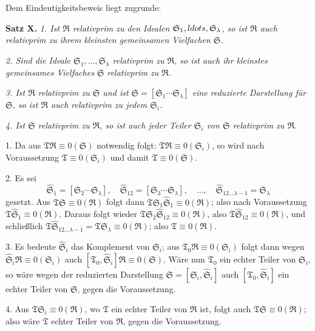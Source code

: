 \documentclass[11pt]{article}
\newcommand{\ideal}[1]{\mathfrak{#1}}
\begin{document}
Dem Eindeutigkeitsbeweis liegt zugrunde:

\textbf{Satz X.} \emph{1. Ist $\ideal R$ relativprim zu den Idealen $\ideal S_1,\\ldots,\ideal S_\lambda$, so ist $\ideal R$ auch relativprim zu ihrem kleinsten gemeinsamen Vielfachen $\ideal S$.}

\emph{2. Sind die Ideale $\ideal S_1,
\ldots,\ideal S_\lambda$ relativprim zu $\ideal R$, so ist auch ihr kleinstes gemeinsames Vielfaches $\ideal S$ relativprim zu $\ideal R$.}

\emph{3. Ist $\ideal R$ relativprim zu $\ideal S$ und ist $\ideal S=[\ideal S_1\cdots\ideal S_\lambda]$ eine reduzierte Darstellung für $\ideal S$, so ist $\ideal R$ auch relativprim zu jedem $\ideal S_i$.}

\emph{4. Ist $\ideal S$ relativprim zu $\ideal R$, so ist auch jeder Teiler $\ideal S_i$ von $\ideal S$ relativprim zu $\ideal R$.}

1. Da aus $\ideal T\ideal R\equiv0(\ideal S)$ notwendig folgt: $\ideal T\ideal R\equiv0(\ideal S_i)$, so wird nach Voraussetzung $\ideal T\equiv0(\ideal S_i)$ und damit $\ideal T\equiv0(\ideal S)$.

2. Es sei
\[
 \widehat{\ideal S}_1=[\ideal S_2\cdots\ideal S_\lambda],\quad
 \widehat{\ideal S}_{12}=[\ideal S_3\cdots\ideal S_\lambda],\quad \ldots,\quad
 \widehat{\ideal S}_{12\ldots\lambda-1}=\ideal S_\lambda
\]
gesetzt. Aus $\ideal T\ideal S\equiv0(\ideal R)$ folgt dann $\ideal T\ideal S_1\widehat{\ideal S}_1\equiv0(\ideal R)$; also nach Voraussetzung $\ideal T\widehat{\ideal S}_1\equiv0(\ideal R)$. Daraus folgt wieder $\ideal T\ideal S_2\widehat{\ideal S}_{12}\equiv0(\ideal R)$, also $\ideal T\widehat{\ideal S}_{12}\equiv0(\ideal R)$, und schließlich $\ideal T\widehat{\ideal S}_{12\ldots\lambda-1}=\ideal T\ideal S_\lambda\equiv0(\ideal R)$; also $\ideal T\equiv0(\ideal R)$.

3. Es bedeute $\widehat{\ideal S}_i$ das Komplement von $\ideal S_i$; aus $\ideal T_0\ideal R\equiv0(\ideal S_i)$ folgt dann wegen $\widehat{\ideal S}_i\ideal R\equiv0(\ideal S_i)$ auch $[\ideal T_0,\widehat{\ideal S}_i]\ideal R\equiv0(\ideal S)$. Wäre nun $\ideal T_0$ ein echter Teiler von $\ideal S_i$, so wäre wegen der reduzierten Darstellung $\ideal S=[\ideal S_i,\widehat{\ideal S}_i]$ auch $[\ideal T_0,
\widehat{\ideal S}_i]$ ein echter Teiler von $\ideal S$, gegen die Voraussetzung.

4. Aus $\ideal T\ideal S_i\equiv0(\ideal R)$, wo $\ideal T$ ein echter Teiler von $\ideal R$ ist, folgt auch $\ideal T\ideal S\equiv0(\ideal R)$; also wäre $\ideal T$ echter Teiler von $\ideal R$, gegen die Voraussetzung.
\end{document}
